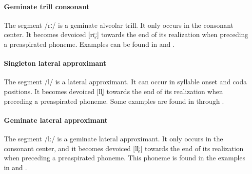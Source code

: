 \paragraph{Geminate trill consonant}
The segment /rː/ is a geminate alveolar trill. It only occurs in the consonant center. 
It becomes devoiced [rr̥ː] towards the end of its realization when preceding a preaspirated phoneme. 
Examples can be found in  and . 

\paragraph{Singleton lateral approximant}
The segment /l/ is a lateral approximant. It can occur in syllable onset and coda positions. 
It becomes devoiced [ll̥] towards the end of its realization when preceding a preaspirated phoneme. 
Some examples are found in  through . 

\paragraph{Geminate lateral approximant}
The segment /lː/ is a geminate lateral approximant. It only occurs in the consonant center, and it becomes devoiced [ll̥ː] towards the end of its realization when preceding a preaspirated phoneme. 
This phoneme is found in the examples in  and .


